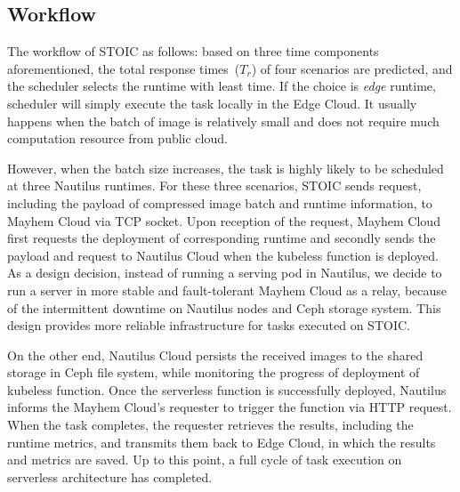  \subsection{Workflow}
 The workflow of STOIC as follows: based on three time components aforementioned, the total response times~($T_r$) of four scenarios are predicted, and the scheduler selects the runtime with least time. If the choice is \textit{edge} runtime, scheduler will simply execute the task locally in the Edge Cloud. It usually happens when the batch of image is relatively small and does not require much computation resource from public cloud.
 
 However, when the batch size increases, the task is highly likely to be scheduled at three Nautilus runtimes. For these three scenarios, STOIC sends request, including the payload of compressed image batch and runtime information, to Mayhem Cloud via TCP socket. Upon reception of the request, Mayhem Cloud first requests the deployment of corresponding runtime and secondly sends the payload and request to Nautilus Cloud when the kubeless function is deployed. As a design decision, instead of running a serving pod in Nautilus, we decide to run a server in more stable and fault-tolerant Mayhem Cloud as a relay, because of the intermittent downtime on Nautilus nodes and Ceph storage system. This design provides more reliable infrastructure for tasks executed on STOIC.
 
 On the other end, Nautilus Cloud persists the received images to the shared storage in Ceph file system, while monitoring the progress of deployment of kubeless function. Once the serverless function is successfully deployed, Nautilus informs the Mayhem Cloud's requester to trigger the function via HTTP request. When the task completes, the requester retrieves the results, including the runtime metrics, and transmits them back to Edge Cloud, in which the results and metrics are saved. Up to this point, a full cycle of task execution on serverless architecture has completed.
 
